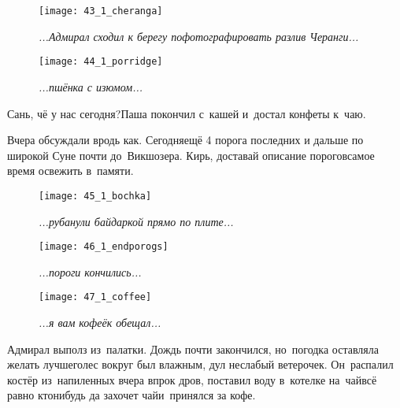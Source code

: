 \begin{figure}[h]
	\centering
	\texttt{[image: 43\_1\_cheranga]}
	\caption{\small\textit{...Адмирал сходил к берегу пофотографировать разлив Черанги...}}
\end{figure}

\newpage

\begin{wrapfigure}[12]{l}{0.48\textwidth}
	\centering
	\texttt{[image: 44\_1\_porridge]}
	\caption{\small\textit{...пшёнка с изюмом...}}
\end{wrapfigure}
\diagdash Сань, чё у нас сегодня?\mdash Паша покончил с~кашей и~достал конфеты к~чаю.

\diagdash Вчера обсуждали вродь как. Сегодня\mdash ещё 4 порога последних и дальше по широкой Суне почти до~Викшозера. Кирь, доставай описание порогов\mdash самое время освежить в~памяти.
\vspace{2em}

\begin{figure}[h]
	\centering
	\texttt{[image: 45\_1\_bochka]}
	\caption{\small\textit{...рубанули байдаркой прямо по плите...}}
\end{figure}

\newpage

\begin{figure}[h]
	\centering
	\texttt{[image: 46\_1\_endporogs]}
	\caption{\small\textit{...пороги кончились...}}
\end{figure}

\newpage

\begin{wrapfigure}[13]{l}{0.5\textwidth}
	\centering
	\texttt{[image: 47\_1\_coffee]}
	\caption{\small\textit{...я вам кофеёк обещал...}}
\end{wrapfigure}
Адмирал выполз из~палатки. Дождь почти закончился, но~погодка оставляла желать лучшего\mdash лес вокруг был влажным, дул неслабый ветерочек. Он~распалил костёр из~напиленных вчера впрок дров, поставил воду в~котелке на~чай\mdash всё равно кто\sdash нибудь да захочет чай\mdash и~принялся за кофе. %

